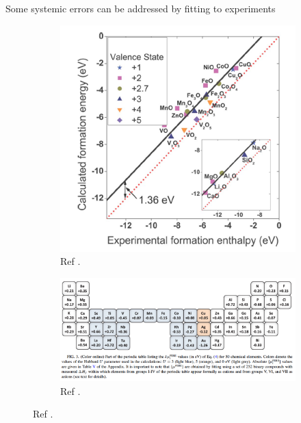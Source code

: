 \documentclass[aspectratio=169]{beamer}
\begin{document}
    \begin{frame}{Some systemic errors can be addressed by fitting to experiments}
        \begin{figure}
            \centering
            \begin{subfigure}{0.35\textwidth}
                \includegraphics[width=\linewidth]{lectures/figures/6_oxidation_fitting.png}
                \caption{Ref \cite{wangOxidationEnergiesTransition2006}.}
            \end{subfigure}
            \begin{subfigure}{0.6\textwidth}
                \includegraphics[width=\linewidth]{lectures/figures/6_oxidation_fitting2.png}
                \caption{Ref \cite{stevanovicCorrectingDensityFunctional2012}.}
            \end{subfigure}
        \end{figure}
    \end{frame}
\end{document}
